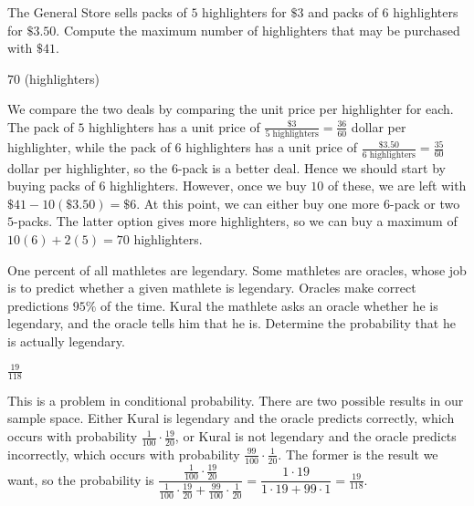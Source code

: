 \documentclass[11pt]{article}
\begin{document}
\begin{problem}%
The General Store sells packs of $5$ highlighters for $\$3$ and packs of $6$ highlighters for $\$3.50$. 
Compute the maximum number of highlighters that may be purchased with $\$41$.
\end{problem}

\begin{answer}
$\boxed{70}$ (highlighters)
\end{answer}

\begin{solution}
We compare the two deals by comparing the unit price per highlighter for each.
The pack of $5$ highlighters has a unit price of $\frac{\$3}{5\text{ highlighters}} = \frac{36}{60}$ dollar per highlighter,
while the pack of $6$ highlighters has a unit price of $\frac{\$3.50}{6\text{ highlighters}} = \frac{35}{60}$ dollar per highlighter,
so the $6$-pack is a better deal.
Hence we should start by buying packs of $6$ highlighters. However, once we buy $10$ of these, we are left
with $\$41 - 10(\$3.50) = \$6$. At this point, we can either buy one more $6$-pack or two $5$-packs.
The latter option gives more highlighters, so we can buy a maximum of $10(6) + 2(5) = \boxed{70}$ highlighters.
\end{solution}


\begin{problem}%
One percent of all mathletes are legendary. Some mathletes are oracles, whose job is to predict
whether a given mathlete is legendary. Oracles make correct predictions $95\%$ of the time.
Kural the mathlete asks an oracle whether he is legendary, and the oracle tells him that he is.
Determine the probability that he is actually legendary.
\end{problem}

\begin{answer}
$\boxed{\frac{19}{118}}$
\end{answer}

\begin{solution}
This is a problem in conditional probability. There are two possible results in our sample space.
Either Kural is legendary and the oracle predicts correctly, which occurs with probability
$\frac{1}{100} \cdot \frac{19}{20}$, or Kural is not legendary and the oracle predicts incorrectly, 
which occurs with probability $\frac{99}{100} \cdot \frac{1}{20}$. The former is the result we
want, so the probability is $\dfrac{\frac{1}{100} \cdot \frac{19}{20}}{\frac{1}{100} \cdot \frac{19}{20} + \frac{99}{100} \cdot \frac{1}{20}}
= \dfrac{1 \cdot 19}{1 \cdot 19 + 99 \cdot 1} = \boxed{\frac{19}{118}}$.
\end{solution}
\end{document}
